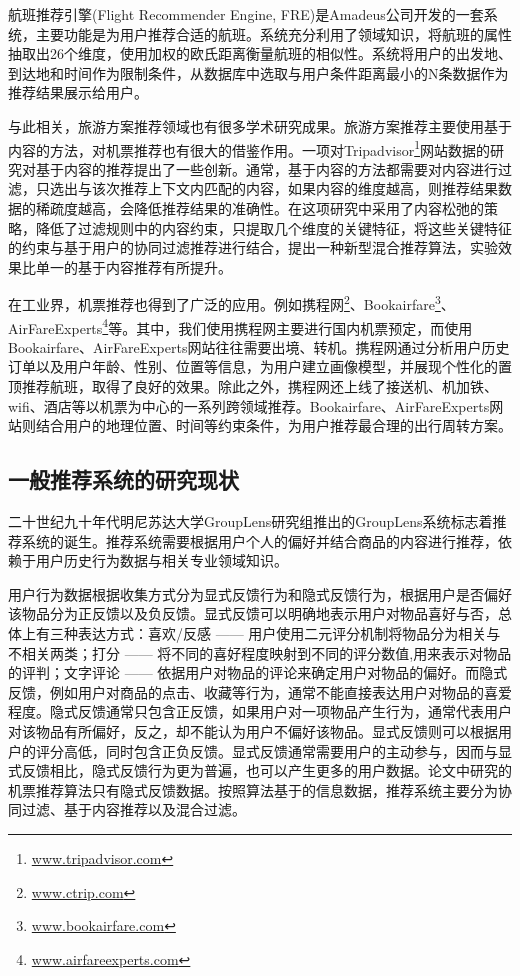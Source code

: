 航班推荐引擎(Flight Recommender Engine, FRE)\cite{barth2014design}是Amadeus公司开发的一套系统，主要功能是为用户推荐合适的航班。系统充分利用了领域知识，将航班的属性抽取出26个维度，使用加权的欧氏距离衡量航班的相似性。系统将用户的出发地、到达地和时间作为限制条件，从数据库中选取与用户条件距离最小的N条数据作为推荐结果展示给用户。

与此相关，旅游方案推荐领域也有很多学术研究成果。旅游方案推荐主要使用基于内容的方法，对机票推荐也有很大的借鉴作用。一项对Tripadvisor\footnote{\url{www.tripadvisor.com}}网站数据的研究对基于内容的推荐提出了一些创新。通常，基于内容的方法都需要对内容进行过滤，只选出与该次推荐上下文内匹配的内容，如果内容的维度越高，则推荐结果数据的稀疏度越高，会降低推荐结果的准确性。在这项研究中采用了内容松弛的策略，降低了过滤规则中的内容约束，只提取几个维度的关键特征，将这些关键特征的约束与基于用户的协同过滤推荐进行结合，提出一种新型混合推荐算法，实验效果比单一的基于内容推荐有所提升。

在工业界，机票推荐也得到了广泛的应用。例如携程网\footnote{\url{www.ctrip.com}}、Bookairfare\footnote{\url{www.bookairfare.com}}、AirFareExperts\footnote{\url{www.airfareexperts.com}}等。其中，我们使用携程网主要进行国内机票预定，而使用Bookairfare、AirFareExperts网站往往需要出境、转机。携程网通过分析用户历史订单以及用户年龄、性别、位置等信息，为用户建立画像模型，并展现个性化的置顶推荐航班，取得了良好的效果。除此之外，携程网还上线了接送机、机加铁、wifi、酒店等以机票为中心的一系列跨领域推荐。Bookairfare、AirFareExperts网站则结合用户的地理位置、时间等约束条件，为用户推荐最合理的出行周转方案。

\subsection{一般推荐系统的研究现状}

二十世纪九十年代明尼苏达大学GroupLens研究组推出的GroupLens系统\cite{konstan1997grouplens}标志着推荐系统的诞生。推荐系统需要根据用户个人的偏好并结合商品的内容进行推荐，依赖于用户历史行为数据与相关专业领域知识。

用户行为数据根据收集方式分为显式反馈行为和隐式反馈行为\cite{nunez2012implicit,lin2001characterized}，根据用户是否偏好该物品分为正反馈以及负反馈\cite{bobadilla2013recommender}。显式反馈可以明确地表示用户对物品喜好与否，总体上有三种表达方式：喜欢/反感 —— 用户使用二元评分机制将物品分为相关与不相关两类；打分 —— 将不同的喜好程度映射到不同的评分数值,用来表示对物品的评判；文字评论 —— 依据用户对物品的评论来确定用户对物品的偏好。而隐式反馈，例如用户对商品的点击、收藏等行为，通常不能直接表达用户对物品的喜爱程度。隐式反馈通常只包含正反馈，如果用户对一项物品产生行为，通常代表用户对该物品有所偏好，反之，却不能认为用户不偏好该物品。显式反馈则可以根据用户的评分高低，同时包含正负反馈。显式反馈通常需要用户的主动参与，因而与显式反馈相比，隐式反馈行为更为普遍，也可以产生更多的用户数据。论文中研究的机票推荐算法只有隐式反馈数据。按照算法基于的信息数据，推荐系统主要分为协同过滤\cite{ekstrand2011collaborative}、基于内容推荐\cite{pazzani2007content,bogers2015report}以及混合过滤\cite{bellogin2013empirical}。

